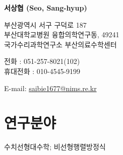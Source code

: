 \documentclass[11pt]{article} %
\begin{document}
{\LARGE\bfseries 서상협 (Seo, Sang-hyup)} %
\bigskip\bigskip\medskip %

부산광역시 서구 구덕로 187\\ %
부산대학교병원 융합의학연구동, 49241\\
국가수리과학연구소 부산의료수학센터
\medskip %

전\phantom{화화}화 : 051-257-8021(102)\\ %
휴대전화 : 010-4545-9199 %
\medskip %

E-mail: \href{mailto:saibie1677@nims.re.kr}{saibie1677@nims.re.kr}\\ %





%


\section*{연구분야}

수치선형대수학; 비선형행렬방정식 %


%
\end{document}
